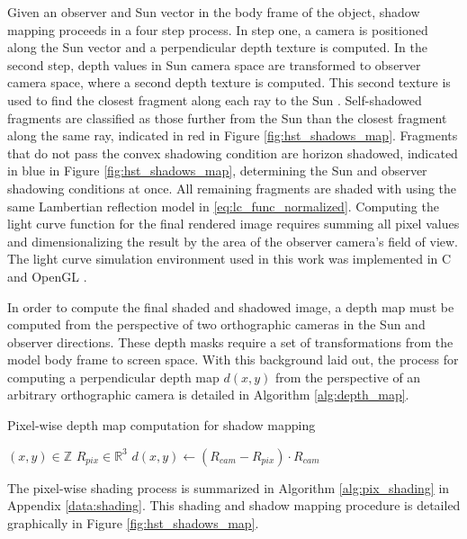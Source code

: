 Given an observer and Sun vector in the body frame of the object, shadow mapping proceeds in a four step process. In step one, a camera is positioned along the Sun vector and a perpendicular depth texture is computed. In the second step, depth values in Sun camera space are transformed to observer camera space, where a second depth texture is computed. This second texture is used to find the closest fragment along each ray to the Sun \cite{brabec2002}. Self-shadowed fragments are classified as those further from the Sun than the closest fragment along the same ray, indicated in red in Figure \ref{fig:hst_shadows_map}. Fragments that do not pass the convex shadowing condition are horizon shadowed, indicated in blue in Figure \ref{fig:hst_shadows_map}, determining the Sun and observer shadowing conditions at once. All remaining fragments are shaded with using the same Lambertian reflection model in \ref{eq:lc_func_normalized}. Computing the light curve function for the final rendered image requires summing all pixel values and dimensionalizing the result by the area of the observer camera's field of view. The light curve simulation environment used in this work was implemented in C and OpenGL \cite{raylib}.

In order to compute the final shaded and shadowed image, a depth map must be computed from the perspective of two orthographic cameras in the Sun and observer directions. These depth masks require a set of transformations from the model body frame to screen space. With this background laid out, the process for computing a perpendicular depth map $d(x,y)$ from the perspective of an arbitrary orthographic camera is detailed in Algorithm \ref{alg:depth_map}.

\begin{algorithm}
  \caption{Pixel-wise depth map computation for shadow mapping} \label{alg:depth_map}
  \begin{algorithmic}
    \State $(x, y) \in \mathbb{Z}$ 
    \State $R_{pix} \in \mathbb{R}^3$ 
    \State $d(x, y) \gets \left( R_{cam} - R_{pix} \right) \cdot R_{cam}$ 
  \end{algorithmic}
\end{algorithm}

The pixel-wise shading process is summarized in Algorithm \ref{alg:pix_shading} in Appendix \ref{data:shading}. This shading and shadow mapping procedure is detailed graphically in Figure \ref{fig:hst_shadows_map}.

